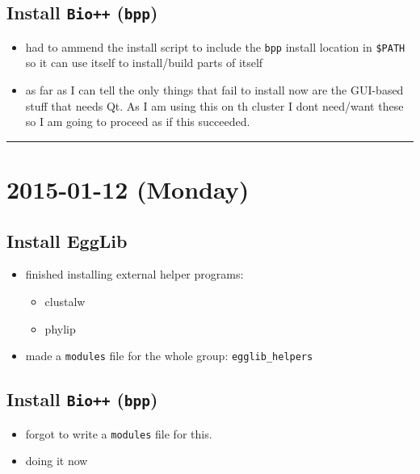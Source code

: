 \documentclass[letterpaper]{scrartcl}
\begin{document}
\subsection{Install \texttt{Bio++}
(\texttt{bpp})}\label{install-bio-bpp-1}

\begin{itemize}
\itemsep1pt\parskip0pt
\item
  had to ammend the install script to include the \texttt{bpp} install
  location in \texttt{\$PATH} so it can use itself to install/build
  parts of itself
\item
  as far as I can tell the only things that fail to install now are the
  GUI-based stuff that needs Qt. As I am using this on th cluster I dont
  need/want these so I am going to proceed as if this succeeded.
\end{itemize}

\begin{center}\rule{0.5\linewidth}{\linethickness}\end{center}

\section{2015-01-12 (Monday)}\label{monday-1}

\subsection{Install EggLib}\label{install-egglib-2}

\begin{itemize}
\itemsep1pt\parskip0pt
\item
  finished installing external helper programs:

  \begin{itemize}
  \itemsep1pt\parskip0pt
  \item
    clustalw
  \item
    phylip
  \end{itemize}
\item
  made a \texttt{modules} file for the whole group:
  \texttt{egglib\_helpers}
\end{itemize}

\subsection{Install \texttt{Bio++}
(\texttt{bpp})}\label{install-bio-bpp-2}

\begin{itemize}
\itemsep1pt\parskip0pt
\item
  forgot to write a \texttt{modules} file for this.
\item
  doing it now
\end{itemize}
\end{document}
